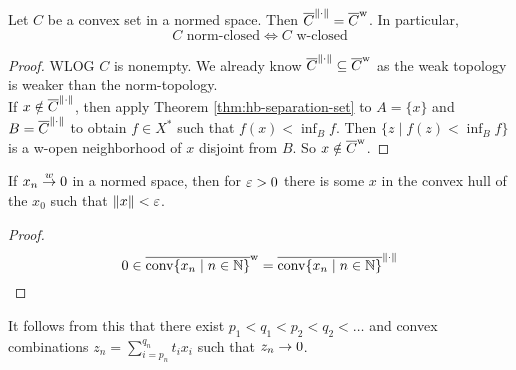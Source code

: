 \documentclass{article}
\begin{document}
\begin{nthm}[Mazur]
  Let $C$ be a convex set in a normed space. Then $\overline{C}^{\left\lVert \cdot\right\rVert} = \overline{C}^{\text w}$. In particular,
  $$C \text{ norm-closed} \iff C \text{ w-closed}$$
\end{nthm}
\begin{proof}
  WLOG $C$ is nonempty. We already know $\overline{C}^{\left\lVert \cdot\right\rVert} \subseteq \overline{C}^{\text w}$ as the weak topology is weaker than the norm-topology. \\
  If $x \notin \overline{C}^{\left\lVert \cdot\right\rVert}$, then apply Theorem \ref{thm:hb-separation-set} to $A = \{x\}$ and $B = \overline{C}^{\left\lVert \cdot\right\rVert}$ to obtain $f \in X^*$ such that $f(x) < \inf_B f$. Then $\{z \mid f(z) < \inf_B f\}$ is a w-open neighborhood of $x$ disjoint from $B$. So $x \notin \overline{C}^{\text w}$.
\end{proof}

\begin{ncor}
  If $x_n \overset w{\rightarrow} 0$ in a normed space, then for $\varepsilon > 0$ there is some $x$ in the convex hull of the $x_0$ such that $\left\lVert x\right\rVert < \varepsilon$.
\end{ncor}
\begin{proof}
  $$0 \in \overline{\operatorname{conv}\{x_n \mid n \in \mathbb N\}}^{\text w} = \overline{\operatorname{conv}\{x_n \mid n \in \mathbb N\}}^{\left\lVert \cdot\right\rVert}$$
\end{proof}

\begin{rmk}
  It follows from this that there exist $p_1 < q_1 < p_2 < q_2 < \dots $ and convex combinations $z_n = \sum_{i = p_n}^{q_n} t_i x_i$ such that $z_n \rightarrow 0$.
\end{rmk}

\newlec

\printindex
\end{document}

